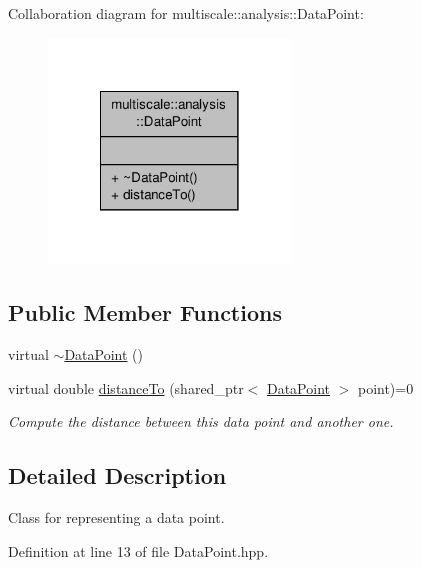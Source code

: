 Collaboration diagram for multiscale\-:\-:analysis\-:\-:Data\-Point\-:\nopagebreak
\begin{figure}[H]
\begin{center}
\leavevmode
\includegraphics[width=182pt]{classmultiscale_1_1analysis_1_1DataPoint__coll__graph}
\end{center}
\end{figure}
\subsection*{Public Member Functions}
\begin{DoxyCompactItemize}
\item 
virtual \hyperlink{classmultiscale_1_1analysis_1_1DataPoint_ab7a7d2baf190376980cd3c2e130a9905}{$\sim$\-Data\-Point} ()
\item 
virtual double \hyperlink{classmultiscale_1_1analysis_1_1DataPoint_a8dd5def96eab756085461e8f6a201dce}{distance\-To} (shared\-\_\-ptr$<$ \hyperlink{classmultiscale_1_1analysis_1_1DataPoint}{Data\-Point} $>$ point)=0
\begin{DoxyCompactList}\small\item\em Compute the distance between this data point and another one. \end{DoxyCompactList}\end{DoxyCompactItemize}


\subsection{Detailed Description}
Class for representing a data point. 

Definition at line 13 of file Data\-Point.\-hpp.



